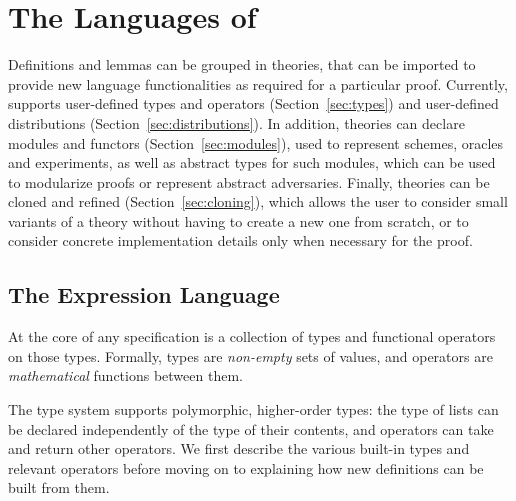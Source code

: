 
\chapter{The Languages of \EasyCrypt\label{chap:theories}}
Definitions and lemmas can be grouped in theories, that can be imported to
provide new language functionalities as required for a particular proof.
Currently, \EasyCrypt supports user-defined types and operators
(Section~\ref{sec:types}) and user-defined distributions
(Section~\ref{sec:distributions}). In addition, theories can declare modules and
functors (Section~\ref{sec:modules}), used to represent schemes, oracles and
experiments, as well as abstract types for such modules, which can be used to
modularize proofs or represent abstract adversaries. Finally, theories can be
cloned and refined (Section~\ref{sec:cloning}), which allows the user to
consider small variants of a theory without having to create a new one from
scratch, or to consider concrete implementation details only when necessary for
the proof.


\section{The Expression Language\label{sec:types}}
At the core of any \EasyCrypt specification is a collection of types and functional
operators on those types. Formally, \EasyCrypt types are \emph{non-empty} sets of
values, and operators are \emph{mathematical} functions between them.


The \EasyCrypt type system supports polymorphic, higher-order types: the type of
lists can be declared independently of the type of their contents, and operators
can take and return other operators. We first describe the various built-in
types and relevant operators before moving on to explaining how new definitions
can be built from them.

